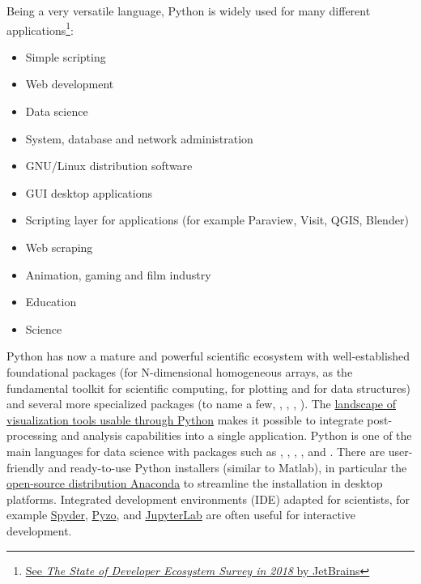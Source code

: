 Being a very versatile language, Python is widely used for many different
applications\footnote{\href{https://www.jetbrains.com/research/devecosystem-2018/python/}{See
\emph{The State of Developer Ecosystem Survey in 2018} by JetBrains}}:

\begin{itemize}
\item Simple scripting

\item Web development

\item Data science

\item System, database and network administration

\item GNU/Linux distribution software

\item GUI desktop applications

\item Scripting layer for applications (for example Paraview, Visit, QGIS,
	Blender)

\item Web scraping

\item Animation, gaming and film industry

\item Education

\item Science

\end{itemize}
%
Python
has now a mature and powerful scientific ecosystem with well-established
foundational packages
%
(\Numpy for N-dimensional homogeneous arrays, \Scipy as the
fundamental toolkit for scientific computing,  for plotting
and  for data structures) and several more specialized packages
(to name a few, , , , ).
The \href{https://github.com/rougier/python-visualization-landscape}{%
landscape of visualization tools usable through Python} makes it possible to
integrate post-processing and analysis capabilities into a single application.
%
Python is one of the main languages for data science with packages such as
, , , ,
 and .
%
There are user-friendly and ready-to-use Python installers (similar to Matlab), in
particular the
\href{https://en.wikipedia.org/wiki/Anaconda_(Python_distribution)}{%
open-source distribution Anaconda} to streamline the installation in 
desktop platforms.
Integrated development environments (IDE) adapted for
scientists, for example \href{https://github.com/spyder-ide/spyder}{Spyder},
\href{https://pyzo.org}{Pyzo},
and \href{https://jupyterlab.readthedocs.io}{JupyterLab} are often useful for
interactive development.

